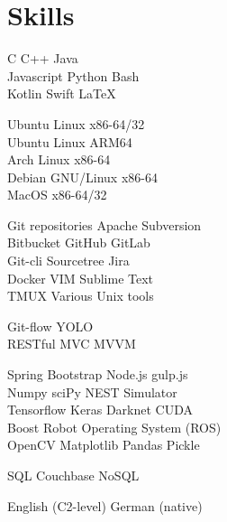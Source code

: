 \documentclass[]{resume}
\begin{document}
\vfill
\begin{minipage}[t]{0.33\textwidth}
\section{Skills}
C \textbullet{} C++ \textbullet{} Java \\
Javascript \textbullet{} Python \textbullet{} Bash \\
Kotlin \textbullet{} Swift \textbullet{} LaTeX \\ \sectionsep

Ubuntu Linux x86-64/32 \\
Ubuntu Linux ARM64 \\
Arch Linux x86-64 \\
Debian GNU/Linux x86-64 \\
MacOS x86-64/32 \\ \sectionsep

Git repositories \textbullet{} Apache Subversion \\
Bitbucket \textbullet{} GitHub \textbullet{} GitLab \\
Git-cli \textbullet{} Sourcetree \textbullet{} Jira \\
Docker \textbullet{} VIM \textbullet{} Sublime Text \\
TMUX \textbullet{} Various Unix tools \\ \sectionsep

Git-flow \textbullet{} YOLO \\
RESTful \textbullet{} MVC \textbullet{} MVVM \\ \sectionsep

Spring \textbullet{} Bootstrap \textbullet{} Node.js \textbullet{} gulp.js \\
Numpy \textbullet{} sciPy \textbullet{} NEST Simulator \\
Tensorflow  \textbullet{} Keras \textbullet{} Darknet \textbullet{} CUDA \\
Boost \textbullet{} Robot Operating System (ROS) \\
OpenCV \textbullet{} Matplotlib \textbullet{} Pandas \textbullet{} Pickle \\ \sectionsep

SQL \textbullet{} Couchbase NoSQL\\ \sectionsep

English (C2-level) \textbullet{} German (native)

\end{minipage}\quad %
\end{document}
